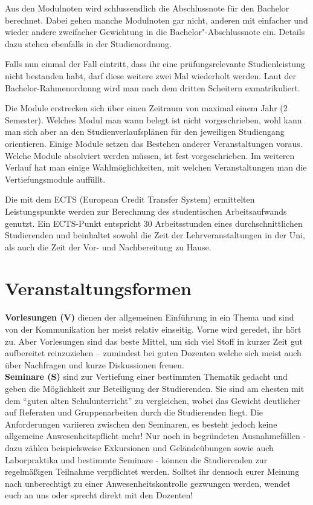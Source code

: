 Aus den Modulnoten wird schlussendlich die Abschlussnote für den Bachelor berechnet. Dabei gehen manche Modulnoten gar nicht, anderen mit einfacher und wieder andere zweifacher Gewichtung in die Bachelor"-Abschlussnote ein. Details dazu stehen ebenfalls in der Studienordnung.

Falls nun einmal der Fall eintritt, dass ihr eine prüfungsrelevante Studienleistung nicht bestanden habt, darf diese weitere zwei Mal wiederholt werden. Laut der Bachelor-Rahmenordnung wird man nach dem dritten Scheitern exmatrikuliert.

Die Module erstrecken sich über einen Zeitraum von maximal einem Jahr (2 Semester). Welches Modul man wann belegt ist nicht vorgeschrieben, wohl kann man sich aber an den Studienverlaufsplänen für den jeweiligen Studiengang orientieren. Einige Module setzen das Bestehen anderer Veranstaltungen voraus. Welche Module absolviert werden müssen, ist fest vorgeschrieben. Im weiteren Verlauf hat man einige Wahlmöglichkeiten, mit welchen Veranstaltungen man die Vertiefungsmodule auffüllt.

Die mit dem ECTS (European Credit Transfer System) ermittelten Leistungspunkte werden zur Berechnung des studentischen Arbeitsaufwands genutzt. Ein ECTS-Punkt entspricht 30 Arbeitsstunden eines durchschnittlichen Studierenden und beinhaltet sowohl die Zeit der Lehrveranstaltungen in der Uni, als auch die Zeit der Vor- und Nachbereitung zu Hause.

\section{Veranstaltungsformen}
\textbf{Vorlesungen (V)} dienen der allgemeinen Einführung in ein Thema und sind von der Kommunikation her meist relativ einseitig. Vorne wird geredet, ihr hört zu. Aber Vorlesungen sind das beste Mittel, um sich viel Stoff in kurzer Zeit gut aufbereitet reinzuziehen – zumindest bei guten Dozenten welche sich meist auch über Nachfragen und kurze Diskussionen freuen.
\\
\textbf{Seminare (S)} sind zur Vertiefung einer bestimmten Thematik gedacht und geben die Möglichkeit zur Beteiligung der Studierenden. Sie sind am ehesten mit dem "`guten alten Schulunterricht"' zu vergleichen, wobei das Gewicht deutlicher auf Referaten und Gruppenarbeiten durch die Studierenden liegt. Die Anforderungen variieren zwischen den Seminaren, es besteht jedoch keine allgemeine Anwesenheitspflicht mehr! Nur noch in begründeten Ausnahmefällen - dazu zählen beispielsweise Exkursionen und Geländeübungen sowie auch Laborpraktika und bestimmte Seminare - können die Studierenden zur regelmäßigen Teilnahme verpflichtet werden. Solltet ihr dennoch eurer Meinung nach unberechtigt zu einer Anwesenheitskontrolle gezwungen werden, wendet euch an uns oder sprecht direkt mit den Dozenten!

